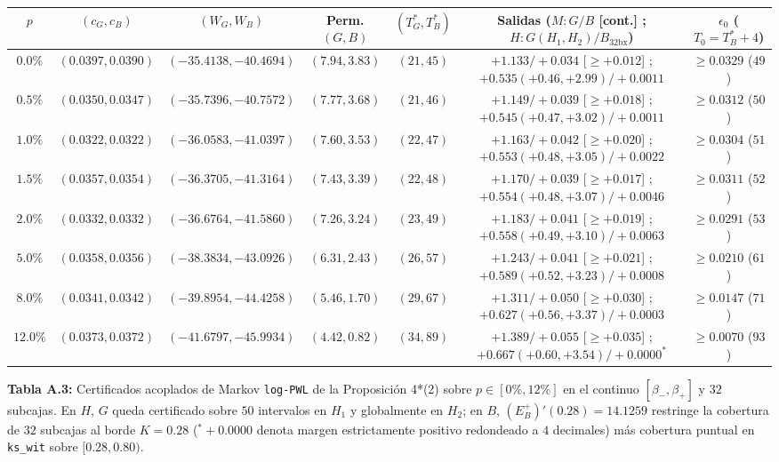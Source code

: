 \documentclass[11pt,letterpaper]{article}
\theoremstyle{plain}
\begin{document}
\begin{table}[htbp]
\centering
\scriptsize
\setlength{\tabcolsep}{2.2pt}
\begin{tabular}{@{}ccccccc@{}}
\toprule
$p$ & $(c_G, c_B)$ & $(W_G, W_B)$ & Perm. $(G,B)$ & $(T^*_G,T^*_B)$ & Salidas ($M: G/B$ [cont.] ; $H: G(H_1,H_2)/B_{32\mathrm{bx}}$) & $\epsilon_0$ ($T_0=T^*_B+4$) \\
\midrule
$0.0\%$ & $(0.0397, 0.0390)$ & $(-35.4138, -40.4694)$ & $(7.94, 3.83)$ & $(21, 45)$ & $+1.133/+0.034$ [$\ge +0.012$] ; $+0.535(+0.46,+2.99)/+0.0011$ & $\ge 0.0329$ ($49$) \\
$0.5\%$ & $(0.0350, 0.0347)$ & $(-35.7396, -40.7572)$ & $(7.77, 3.68)$ & $(21, 46)$ & $+1.149/+0.039$ [$\ge +0.018$] ; $+0.545(+0.47,+3.02)/+0.0011$ & $\ge 0.0312$ ($50$) \\
$1.0\%$ & $(0.0322, 0.0322)$ & $(-36.0583, -41.0397)$ & $(7.60, 3.53)$ & $(22, 47)$ & $+1.163/+0.042$ [$\ge +0.020$] ; $+0.553(+0.48,+3.05)/+0.0022$ & $\ge 0.0304$ ($51$) \\
$1.5\%$ & $(0.0357, 0.0354)$ & $(-36.3705, -41.3164)$ & $(7.43, 3.39)$ & $(22, 48)$ & $+1.170/+0.039$ [$\ge +0.017$] ; $+0.554(+0.48,+3.07)/+0.0046$ & $\ge 0.0311$ ($52$) \\
$2.0\%$ & $(0.0332, 0.0332)$ & $(-36.6764, -41.5860)$ & $(7.26, 3.24)$ & $(23, 49)$ & $+1.183/+0.041$ [$\ge +0.019$] ; $+0.558(+0.49,+3.10)/+0.0063$ & $\ge 0.0291$ ($53$) \\
$5.0\%$ & $(0.0358, 0.0356)$ & $(-38.3834, -43.0926)$ & $(6.31, 2.43)$ & $(26, 57)$ & $+1.243/+0.041$ [$\ge +0.021$] ; $+0.589(+0.52,+3.23)/+0.0008$ & $\ge 0.0210$ ($61$) \\
$8.0\%$ & $(0.0341, 0.0342)$ & $(-39.8954, -44.4258)$ & $(5.46, 1.70)$ & $(29, 67)$ & $+1.311/+0.050$ [$\ge +0.030$] ; $+0.627(+0.56,+3.37)/+0.0003$ & $\ge 0.0147$ ($71$) \\
$12.0\%$ & $(0.0373, 0.0372)$ & $(-41.6797, -45.9934)$ & $(4.42, 0.82)$ & $(34, 89)$ & $+1.389/+0.055$ [$\ge +0.035$] ; $+0.667(+0.60,+3.54)/+0.0000^*$ & $\ge 0.0070$ ($93$) \\
\bottomrule
\end{tabular}
\par\vspace{0.45em}
\begin{minipage}{0.95\linewidth}\centering\footnotesize
\textbf{Tabla A.3:} Certificados acoplados de Markov \texttt{log-PWL} de la Proposición 4*(2) sobre $p\in[0\%,12\%]$ en el continuo $[\beta_-,\beta_+]$ y $32$ subcajas. En $H$, $G$ queda certificado sobre $50$ intervalos en $H_1$ y globalmente en $H_2$; en $B$, $(E_B^+)'(0.28)=14.1259$ restringe la cobertura de $32$ subcajas al borde $K=0.28$ ($^*+0.0000$ denota margen estrictamente positivo redondeado a $4$ decimales) más cobertura puntual en \texttt{ks\_wit} sobre $[0.28,0.80)$.
\end{minipage}
\end{table}
\end{document}

